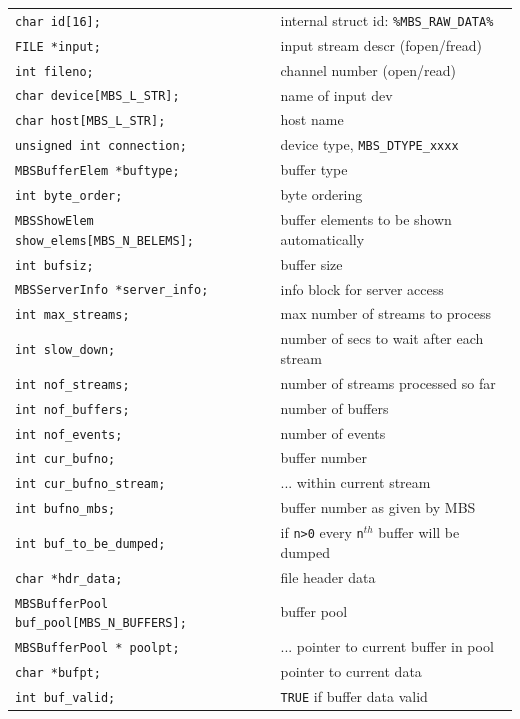 \documentclass[10pt,a4paper]{article}
\begin{document}
\begin{center}
\begin{tabular}{ll}
	\verb+char id[16];+ 				&		internal struct id: \verb+%MBS_RAW_DATA%+	\\
	\verb+FILE *input;+ 				&		input stream descr (fopen/fread)	\\
	\verb+int fileno;+				&		channel number (open/read)	\\
	\verb+char device[MBS_L_STR];+			&		name of input dev	\\
	\verb+char host[MBS_L_STR];+			&		host name	\\
	\verb+unsigned int connection;+ 		&		device type, \verb+MBS_DTYPE_xxxx+ \\
	\verb+MBSBufferElem *buftype;+			&		buffer type \\
	\verb+int byte_order;+				&		byte ordering	\\
	\verb+MBSShowElem show_elems[MBS_N_BELEMS];+	&		buffer elements to be shown automatically	\\
	\verb+int bufsiz;+				&		buffer size \\
	\verb+MBSServerInfo *server_info;+		&		info block for server access	\\
	\verb+int max_streams;+ 			&		max number of streams to process \\
	\verb+int slow_down;+				&		number of secs to wait after each stream \\
	\verb+int nof_streams;+ 			&		number of streams processed so far	\\
	\verb+int nof_buffers;+ 			&		number of buffers	\\
	\verb+int nof_events;+				&		number of events \\
	\verb+int cur_bufno;+				&		buffer number	\\
	\verb+int cur_bufno_stream;+			&		... within current stream	\\
	\verb+int bufno_mbs;+				&		buffer number as given by MBS	\\
	\verb+int buf_to_be_dumped;+			&		if \verb+n>0+ every \verb+n+$^{th}$ buffer will be dumped	\\
	\verb+char *hdr_data;+				&		file header data	\\
	\verb+MBSBufferPool buf_pool[MBS_N_BUFFERS];+	&		buffer pool \\
	\verb+MBSBufferPool * poolpt;+			&		... pointer to current buffer in pool	\\
	\verb+char *bufpt;+ 				&		pointer to current data \\
	\verb+int buf_valid;+				&		\verb+TRUE+ if buffer data valid	\\

\end{tabular}
\end{center}
\end{document}

